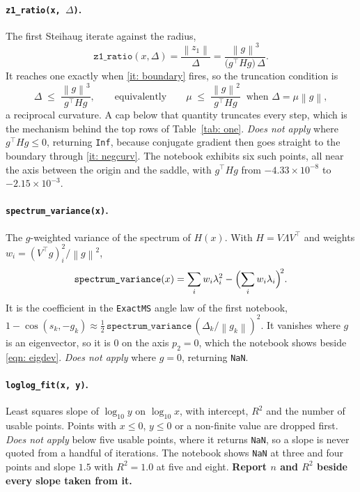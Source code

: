 \documentclass[11pt,a4paper]{article}
\providecommand{\norm}[1]{\left \lVert #1 \right \rVert}
\theoremstyle{remark}
\begin{document}
\paragraph{\texttt{z1\_ratio(x, $\Delta$)}.}
The first Steihaug iterate against the radius,
\begin{equation}
  \texttt{z1\_ratio}(x, \Delta)
    = \frac{\norm{z_1}}{\Delta}
    = \frac{\norm{g}^{3}}{\bigl(g^{\!\top}Hg\bigr)\,\Delta}.
  \label{eqn: z1}
\end{equation}
It reaches one exactly when \ref{it: boundary} fires, so the truncation condition
is
\begin{equation}
  \Delta \;\leq\; \frac{\norm{g}^{3}}{g^{\!\top}Hg},
  \qquad\text{equivalently}\qquad
  \mu \;\leq\; \frac{\norm{g}^{2}}{g^{\!\top}Hg}
  \ \text{ when } \Delta = \mu\norm{g},
  \label{eqn: trunc condition}
\end{equation}
a reciprocal curvature. A cap below that quantity truncates every step, which is
the mechanism behind the top rows of Table~\ref{tab: one}.
\emph{Does not apply} where $g^{\!\top}Hg \leq 0$, returning \texttt{Inf},
because conjugate gradient then goes straight to the boundary through
\ref{it: negcurv}. The notebook exhibits six such points, all near the axis
between the origin and the saddle, with $g^{\!\top}Hg$ from
$-4.33\times10^{-8}$ to $-2.15\times10^{-3}$.

\paragraph{\texttt{spectrum\_variance(x)}.}
The $g$-weighted variance of the spectrum of $H(x)$. With $H = V\Lambda V^{\!\top}$
and weights $w_i = (V^{\!\top}g)_i^2/\norm{g}^2$,
\begin{equation}
  \texttt{spectrum\_variance}(x)
    = \sum_i w_i\lambda_i^2 - \Bigl(\sum_i w_i\lambda_i\Bigr)^{\!2}.
  \label{eqn: specvar}
\end{equation}
It is the coefficient in the \texttt{ExactMS} angle law of the first notebook,
$1 - \cos(s_k,-g_k) \approx \tfrac12\,\texttt{spectrum\_variance}\,(\Delta_k/\norm{g_k})^2$.
It vanishes where $g$ is an eigenvector, so it is $0$ on the axis $p_2 = 0$,
which the notebook shows beside \eqref{eqn: eigdev}. \emph{Does not apply} where
$g = 0$, returning \texttt{NaN}.

\paragraph{\texttt{loglog\_fit(x, y)}.}
Least squares slope of $\log_{10}y$ on $\log_{10}x$, with intercept, $R^2$ and
the number of usable points. Points with $x \leq 0$, $y \leq 0$ or a non-finite
value are dropped first. \emph{Does not apply} below five usable points, where it
returns \texttt{NaN}, so a slope is never quoted from a handful of iterations.
The notebook shows \texttt{NaN} at three and four points and slope $1.5$ with
$R^2 = 1.0$ at five and eight. \textbf{Report $n$ and $R^2$ beside every slope
taken from it.}
\end{document}

